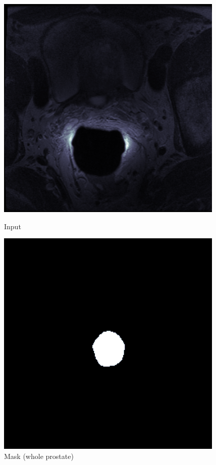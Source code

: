 \documentclass[runningheads,a4paper,11pt]{report}
\begin{document}
\begin{figure}[!h]
\centering
  \begin{minipage}[b]{0.4\textwidth}
    \includegraphics[width=\textwidth]{images/input_prostate.png}
    \caption{Input}
  \end{minipage}
  \begin{minipage}[b]{0.4\textwidth}
    \includegraphics[width=\textwidth]{images/mask_prostate.png}
    \caption{Mask (whole prostate)}
  \end{minipage}
\end{figure}
\end{document}
